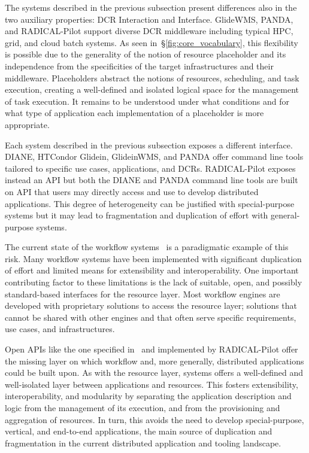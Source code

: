 \documentclass{sig-alternate}
\begin{document}

The \pilot systems described in the previous subsection present differences also
in the two auxiliary properties: DCR Interaction and Interface. GlideWMS, PANDA,
and RADICAL-Pilot support diverse DCR middleware including typical HPC, grid,
and cloud batch systems. As seen in~\S\ref{fig:core_vocabulary}, this
flexibility is possible due to the generality of the notion of resource
placeholder and its independence from the specificities of the target
infrastructures and their middleware. Placeholders abstract the notions of
resources, scheduling, and task execution, creating a well-defined and isolated
logical space for the management of task execution. It remains to be understood
under what conditions and for what type of application each implementation of a
placeholder is more appropriate.


Each \pilot system described in the previous subsection exposes a different
interface.  DIANE, HTCondor Glidein, GlideinWMS, and
PANDA offer command line tools tailored to specific use cases, applications, and
DCRs. RADICAL-Pilot exposes instead an API but both the DIANE and PANDA command
line tools are built on API that users may directly access and use to develop
distributed applications. This degree of heterogeneity can be justified with
special-purpose \pilot systems but it may lead to fragmentation and duplication
of effort with general-purpose systems.

The current state of the workflow systems~\cite{taylor2014} is a paradigmatic
example of this risk. Many workflow systems have been implemented with
significant duplication of effort and limited means for extensibility and
interoperability. One important contributing factor to these limitations is the
lack of suitable, open, and possibly standard-based interfaces for the resource
layer. Most workflow engines are developed with proprietary solutions to access
the resource layer; solutions that cannot be shared with other engines and that
often serve specific requirements, use cases, and infrastructures. 


Open APIs like the one specified in~\cite{luckow2012b} and implemented by
RADICAL-Pilot offer the missing layer on which workflow and, more generally,
distributed applications could be built upon. As with the resource layer, \pilot
systems offers a well-defined and well-isolated layer between applications and
resources. This fosters extensibility, interoperability, and modularity by
separating the application description and logic from the management of its
execution, and from the provisioning and aggregation of resources. In turn, this
avoids the need to develop special-purpose, vertical, and end-to-end
applications, the main source of duplication and fragmentation in the current
distributed application and tooling landscape.
\end{document}

